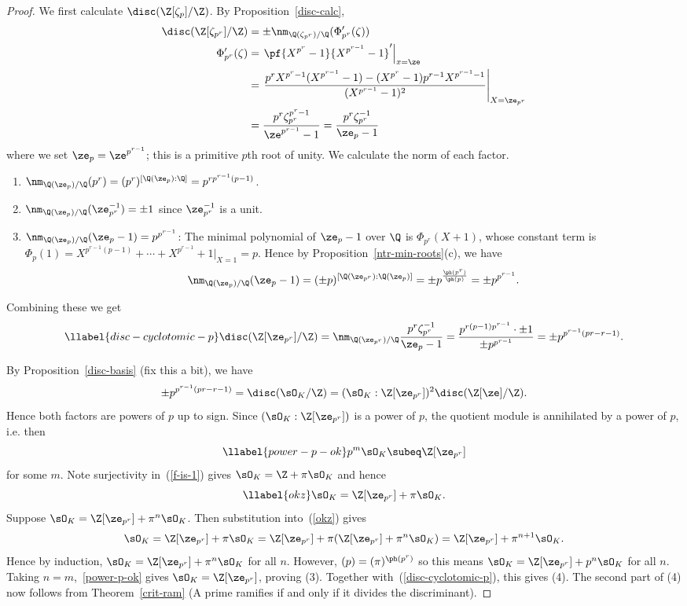 \begin{proof}
We first calculate $\disc(\Z[\zeta_p]/\Z)$. By Proposition~\ref{disc-calc},
\begin{align*}
\disc(\Z[\zeta_{p^r}]/\Z)&=\pm \nm_{\Q(\zeta_{p^r})/\Q} (\Phi'_{p^r}(\zeta))\\
\Phi'_{p^r}(\zeta)
&=\left.\pf{X^{p^r}-1}{X^{p^{r-1}}-1}'\right|_{x=\ze}\\
&=\left.\frac
{p^rX^{p^r-1}(X^{p^{r-1}}-1)-(X^{p^r}-1)p^{r-1}X^{p^{r-1}-1}}
{(X^{p^{r-1}}-1)^2}\right|_{X=\ze_{p^r}}\\
&=\frac{p^r\zeta_{p^r}^{p^r-1}}{\ze^{p^{r-1}}-1}
=\frac{p^r\zeta_{p^r}^{-1}}{\ze_p-1}
\end{align*}
where we set $\ze_p=\ze^{p^{r-1}}$; this is a primitive $p$th root of unity. We calculate the norm of each factor.
\begin{enumerate}
\item $\nm_{\Q(\ze_p)/\Q}(p^r)=(p^r)^{[\Q(\ze_p):\Q]}=p^{rp^{r-1}(p-1)}$.
\item $\nm_{\Q(\ze_p)/\Q}(\ze_{p^r}^{-1})=\pm 1$ since $\ze_{p^r}^{-1}$ is a unit.
\item $\nm_{\Q(\ze_p)/\Q}(\ze_p-1)=p^{p^{r-1}}$: The minimal polynomial of $\ze_p-1$ over $\Q$ is 
$\Phi_{p^r}(X+1)$, whose constant term is $\Phi_{p}(1)=X^{p^{r-1}(p-1)}+\cdots +X^{p^{r-1}}+1|_{X=1}=p$. Hence by Proposition~\ref{ntr-min-roots}(c), we have
\[
\nm_{\Q(\ze_p)/\Q}(\ze_p-1)=(\pm p)^{[\Q(\ze_{p^r}):\Q(\ze_p)]}
=\pm p^{\frac{\ph(p^r)}{\ph(p)}}=\pm p^{p^{r-1}}.
\]
\end{enumerate}
Combining these we get
\begin{equation}\llabel{disc-cyclotomic-p}
\disc(\Z[\ze_{p^r}]/\Z)=\nm_{\Q(\ze_{p^r})/\Q}\frac{p^r \zeta_{p^r}^{-1}}{\ze_p-1}=\frac{p^{r(p-1)p^{r-1}}\cdot \pm1}{\pm p^{p^{r-1}}}=\pm p^{p^{r-1}(pr-r-1)}.
\end{equation}

By Proposition~\ref{disc-basis} (fix this a bit), we have
\[
\pm p^{p^{r-1}(pr-r-1)}=\disc(\sO_K/\Z)=(\sO_K:\Z[\ze_{p^r}])^2\disc(\Z[\ze]/\Z).
\]
Hence both factors are powers of $p$ up to sign. Since $(\sO_K:\Z[\ze_{p^r}])$ is a power of $p$, the quotient module is annihilated by a power of $p$, i.e. then 
\begin{equation}\llabel{power-p-ok}
p^m\sO_K\subeq \Z[\ze_{p^r}]
\end{equation}
for some $m$.  Note surjectivity in~(\ref{f-is-1}) gives $\sO_K=\Z+\pi\sO_K$ and hence
\begin{equation}\llabel{okz}
\sO_K=\Z[\ze_{p^r}]+\pi\sO_K.
\end{equation}
Suppose $\sO_K=\Z[\ze_{p^r}]+\pi^n\sO_K$. Then substitution into~(\ref{okz}) gives
\[
\sO_K=\Z[\ze_{p^r}]+\pi\sO_K=\Z[\ze_{p^r}]+\pi(\Z[\ze_{p^r}]+\pi^n\sO_K) =\Z[\ze_{p^r}]+\pi^{n+1}\sO_K.
\]
Hence by induction, $\sO_K=\Z[\ze_{p^r}]+\pi^n\sO_K$ for all $n$. However, $(p)=(\pi)^{\ph(p^r)}$ so this means $\sO_K=\Z[\ze_{p^r}]+p^n\sO_K$ for all $n$. Taking $n=m$,~\eqref{power-p-ok} gives $\sO_K=\Z[\ze_{p^r}]$, proving (3). Together with~(\ref{disc-cyclotomic-p}), this gives (4). The second part of (4) now follows from Theorem~\ref{crit-ram} (A prime ramifies if and only if it divides the discriminant).


\end{proof}
